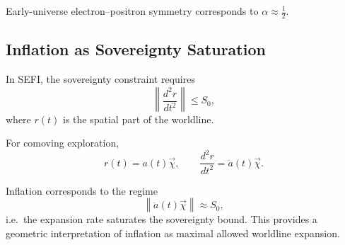 Early-universe electron--positron symmetry corresponds to $\alpha \approx \tfrac{1}{2}$.

\subsection{Inflation as Sovereignty Saturation}

In SEFI, the sovereignty constraint requires
\begin{equation}
\left\| \frac{d^2 r}{dt^2} \right\| \le S_0,
\end{equation}
where $r(t)$ is the spatial part of the worldline.

For comoving exploration,
\begin{equation}
r(t) = a(t)\vec{\chi},
\qquad
\frac{d^2 r}{dt^2} = \ddot{a}(t)\vec{\chi}.
\end{equation}

Inflation corresponds to the regime
\begin{equation}
\left\| \ddot{a}(t)\vec{\chi} \right\| \approx S_0,
\end{equation}
i.e.\ the expansion rate saturates the sovereignty bound. This provides a geometric
interpretation of inflation as maximal allowed worldline expansion.

